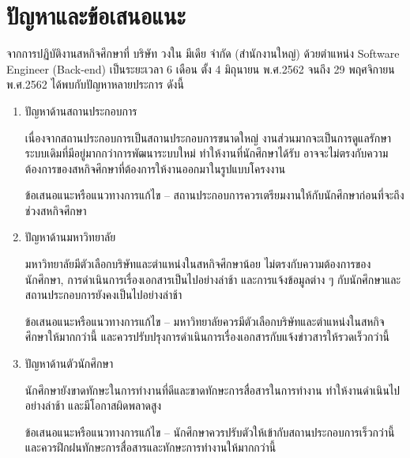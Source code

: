 \chapter{ปัญหาและข้อเสนอแนะ}
\label{chapter:problems-and-solution}

จากการปฏิบัติงานสหกิจศึกษาที่ บริษัท วงใน มีเดีย จำกัด (สำนักงานใหญ่) ด้วยตำแหน่ง Software Engineer (Back-end) เป็นระยะเวลา 6 เดือน ตั้ง 4 มิถุนายน พ.ศ.2562 จนถึง 29 พฤศจิกายน พ.ศ.2562 ได้พบกับปัญหาหลายประการ ดังนี้

\begin{enumerate}
	\item ปัญหาด้านสถานประกอบการ
	
	เนื่องจากสถานประกอบการเป็นสถานประกอบการขนาดใหญ่ งานส่วนมากจะเป็นการดูแลรักษาระบบเดิมที่มีอยู่มากกว่าการพัฒนาระบบใหม่ ทำให้งานที่นักศึกษาได้รับ อาจจะไม่ตรงกับความต้องการของสหกิจศึกษาที่ต้องการให้งานออกมาในรูปแบบโครงงาน
	
	ข้อเสนอแนะหรือแนวทางการแก้ไข – สถานประกอบการควรเตรียมงานให้กับนักศึกษาก่อนที่จะถึงช่วงสหกิจศึกษา
	
	\item ปัญหาด้านมหาวิทยาลัย
	
	มหาวิทยาลัยมีตัวเลือกบริษัทและตำแหน่งในสหกิจศึกษาน้อย ไม่ตรงกับความต้องการของนักศึกษา, การดำเนินการเรื่องเอกสารเป็นไปอย่างล่าช้า และการแจ้งข้อมูลต่าง ๆ กับนักศึกษาและสถานประกอบการยังคงเป็นไปอย่างล่าช้า
	
	ข้อเสนอแนะหรือแนวทางการแก้ไข – มหาวิทยาลัยควรมีตัวเลือกบริษัทและตำแหน่งในสหกิจศึกษาให้มากกว่านี้ และควรปรับปรุงการดำเนินการเรื่องเอกสารกับแจ้งข่าวสารให้รวดเร็วกว่านี้
	
	\item ปัญหาด้านตัวนักศึกษา
	
	นักศึกษายังขาดทักษะในการทำงานที่ดีและขาดทักษะการสื่อสารในการทำงาน ทำให้งานดำเนินไปอย่างล่าช้า และมีโอกาสผิดพลาดสูง
	
	ข้อเสนอแนะหรือแนวทางการแก้ไข – นักศึกษาควรปรับตัวให้เข้ากับสถานประกอบการเร็วกว่านี้ และควรฝึกฝนทักษะการสื่อสารและทักษะการทำงานให้มากกว่านี้
\end{enumerate}
